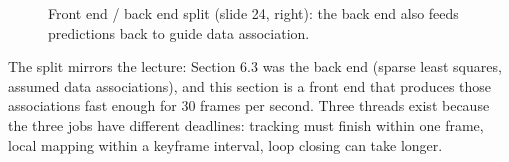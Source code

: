 \documentclass[11pt,a4paper]{article}
\theoremstyle{definition}
\theoremstyle{plain}
\theoremstyle{remark}
\begin{document}
\begin{figure}[htbp]\centering
{}
\caption{Front end / back end split (slide 24, right): the back end also feeds predictions back to guide data association.}
\end{figure}
\begin{intuition}
The split mirrors the lecture: Section 6.3 was the back end (sparse least squares, assumed data associations), and this section is a front end that produces those associations fast enough for 30 frames per second. Three threads exist because the three jobs have different deadlines: tracking must finish within one frame, local mapping within a keyframe interval, loop closing can take longer.
\end{intuition}
\end{document}
